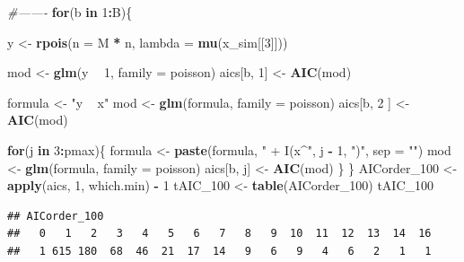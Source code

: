 \documentclass[]{article}
\newenvironment{Shaded}{\begin{snugshade}}{\end{snugshade}}
\newcommand{\CommentTok}[1]{\textcolor[rgb]{0.56,0.35,0.01}{\textit{#1}}}
\newcommand{\ControlFlowTok}[1]{\textcolor[rgb]{0.13,0.29,0.53}{\textbf{#1}}}
\newcommand{\DataTypeTok}[1]{\textcolor[rgb]{0.13,0.29,0.53}{#1}}
\newcommand{\DecValTok}[1]{\textcolor[rgb]{0.00,0.00,0.81}{#1}}
\newcommand{\KeywordTok}[1]{\textcolor[rgb]{0.13,0.29,0.53}{\textbf{#1}}}
\newcommand{\NormalTok}[1]{#1}
\newcommand{\OperatorTok}[1]{\textcolor[rgb]{0.81,0.36,0.00}{\textbf{#1}}}
\newcommand{\StringTok}[1]{\textcolor[rgb]{0.31,0.60,0.02}{#1}}
\begin{document}
\begin{Shaded}
\begin{Highlighting}[]
\CommentTok{#-------}
\ControlFlowTok{for}\NormalTok{(b }\ControlFlowTok{in} \DecValTok{1}\OperatorTok{:}\NormalTok{B)\{}
  
\NormalTok{  y <-}\StringTok{ }\KeywordTok{rpois}\NormalTok{(}\DataTypeTok{n =}\NormalTok{ M }\OperatorTok{*}\StringTok{ }\NormalTok{n, }\DataTypeTok{lambda =} \KeywordTok{mu}\NormalTok{(x_sim[[}\DecValTok{3}\NormalTok{]]))}
  
\NormalTok{  mod <-}\StringTok{ }\KeywordTok{glm}\NormalTok{(y }\OperatorTok{~}\StringTok{ }\DecValTok{1}\NormalTok{, }\DataTypeTok{family =}\NormalTok{ poisson)}
\NormalTok{  aics[b, }\DecValTok{1}\NormalTok{] <-}\StringTok{ }\KeywordTok{AIC}\NormalTok{(mod)}
  
\NormalTok{  formula <-}\StringTok{ "y ~ x"}
\NormalTok{  mod <-}\StringTok{ }\KeywordTok{glm}\NormalTok{(formula, }\DataTypeTok{family =}\NormalTok{ poisson)}
\NormalTok{  aics[b, }\DecValTok{2}\NormalTok{ ] <-}\StringTok{ }\KeywordTok{AIC}\NormalTok{(mod)}
  
  \ControlFlowTok{for}\NormalTok{(j }\ControlFlowTok{in} \DecValTok{3}\OperatorTok{:}\NormalTok{pmax)\{}
\NormalTok{    formula <-}\StringTok{ }\KeywordTok{paste}\NormalTok{(formula, }\StringTok{" + I(x^"}\NormalTok{, j }\OperatorTok{-}\StringTok{ }\DecValTok{1}\NormalTok{, }\StringTok{")"}\NormalTok{, }\DataTypeTok{sep =} \StringTok{""}\NormalTok{)}
\NormalTok{    mod <-}\StringTok{ }\KeywordTok{glm}\NormalTok{(formula, }\DataTypeTok{family =}\NormalTok{ poisson)}
\NormalTok{    aics[b, j] <-}\StringTok{ }\KeywordTok{AIC}\NormalTok{(mod)}
\NormalTok{  \}}
\NormalTok{\}}
\NormalTok{AICorder_}\DecValTok{100}\NormalTok{ <-}\StringTok{ }\KeywordTok{apply}\NormalTok{(aics, }\DecValTok{1}\NormalTok{, which.min) }\OperatorTok{-}\StringTok{ }\DecValTok{1}
\NormalTok{tAIC_}\DecValTok{100}\NormalTok{ <-}\StringTok{ }\KeywordTok{table}\NormalTok{(AICorder_}\DecValTok{100}\NormalTok{)}
\NormalTok{tAIC_}\DecValTok{100}
\end{Highlighting}
\end{Shaded}

\begin{verbatim}
## AICorder_100
##   0   1   2   3   4   5   6   7   8   9  10  11  12  13  14  16 
##   1 615 180  68  46  21  17  14   9   6   9   4   6   2   1   1
\end{verbatim}
\end{document}
